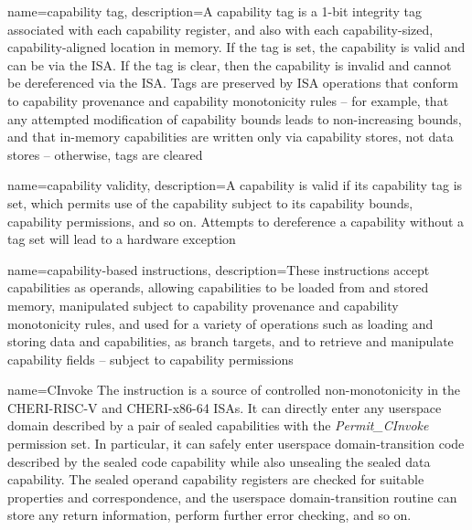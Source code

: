 {
  name=capability tag,
  description={A capability tag is a 1-bit integrity tag associated with each
    \gls{capability register}, and also with each capability-sized,
    capability-aligned location in memory.
    If the tag is set, the \gls{capability} is valid and can be
     via the ISA.
    If the tag is clear, then the capability is invalid and cannot be
    dereferenced via the ISA.
    Tags are preserved 
by ISA
operations that conform to \gls{capability
    provenance} and \gls{capability monotonicity} rules -- for example,
    that any attempted modification of \gls{capability bounds} leads to
    non-increasing bounds,
 and that in-memory capabilities are written only
    via capability stores, not data stores -- otherwise, tags are cleared}
%
}

{
  name=capability validity,
  description={A \gls{capability} is valid if its \gls{capability tag}
    is set, which permits use of the capability subject to its
    \gls{capability bounds}, \gls{capability permissions}, and so on.
    Attempts to \gls{dereference} a capability without a tag set will lead
    to a hardware exception}
}

{
  name=capability-based instructions,
  description={These instructions accept capabilities as operands, allowing
    capabilities to be loaded from and stored memory, manipulated subject to
    \gls{capability provenance} and \gls{capability monotonicity} rules,
    and used for a variety of operations such as loading and storing data and
    capabilities, as branch targets, and to retrieve and manipulate capability
    fields -- subject to \gls{capability permissions}}
}

{
  name=CInvoke
}
{
  The  instruction is a source of controlled
  non-monotonicity in the \gls{CHERI-RISC-V} and \gls{CHERI-x86-64} ISAs.
  It can directly enter any userspace domain described by a pair
  of sealed capabilities with the \emph{Permit\_CInvoke} permission set.
  In particular, it can
  safely enter userspace domain-transition code
  described by the sealed \gls{code capability} while also unsealing
  the sealed \gls{data capability}.
  The sealed operand \glspl{capability register}
  are checked for suitable properties and correspondence, and the userspace
  domain-transition routine can store any return information, perform further error
  checking, and so on.
}

